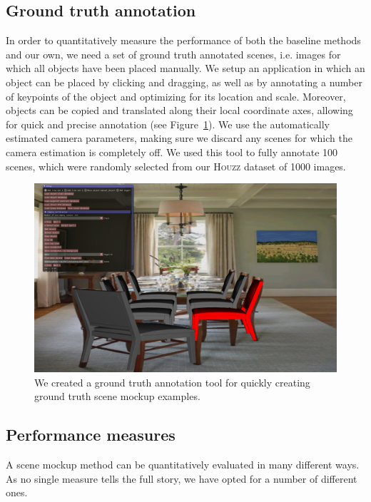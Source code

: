 \documentclass[10pt,twocolumn,letterpaper]{article}
\begin{document}
\subsection{Ground truth annotation}
\label{sec:ch4:ground_truth_annotation}
In order to quantitatively measure the performance of both the baseline methods
and our own, we need a set of ground truth annotated scenes, i.e. images for
which all objects have been placed manually.  We setup an application in which
an object can be placed by clicking and dragging, as well as by annotating a
number of keypoints of the object and optimizing for its location and scale.
Moreover, objects can be copied and translated along their local coordinate
axes, allowing for quick and precise annotation (see
Figure~\ref{fig:ch4:gt_annotation}). We use the automatically estimated camera
parameters, making sure we discard any scenes for which the camera estimation
is completely off.  We used this tool to fully annotate 100 scenes, which were
randomly selected from our \textsc{Houzz} dataset of 1000 images.

\begin{figure}
    \includegraphics[width=\linewidth]{figures/groundtruth_annotation/groundtruth_annotation}
    \caption[Annotation tool]{We created a ground truth annotation tool for quickly creating ground truth scene mockup examples.}
    \label{fig:ch4:gt_annotation}
\end{figure}

\subsection{Performance measures}
\label{sec:ch4:performance_measures}
A scene mockup method can be quantitatively evaluated in many different ways.
As no single measure tells the full story, we have opted for a number of
different ones. 
\end{document}
